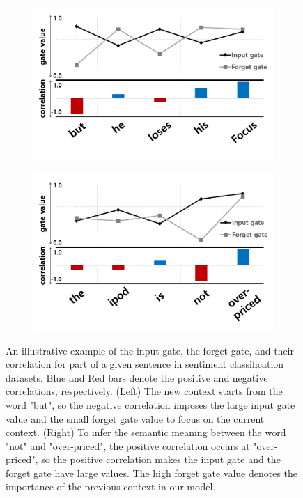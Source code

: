 \documentclass[letterpaper]{article} %
\begin{document}
\begin{figure}
	\centering
	\begin{subfigure}[]{0.48\columnwidth}
		\includegraphics[width=\linewidth]{intro_fig2.png}
	\end{subfigure}
	\begin{subfigure}[]{0.48\columnwidth}
		\includegraphics[width=\linewidth]{intro_fig1.png}
	\end{subfigure}
	\caption{An illustrative example of the input gate, the forget gate, and their correlation for part of a given sentence in sentiment classification datasets. Blue and Red bars denote the positive and negative correlations, respectively.
		(Left) The new context starts from the word "but", so the negative correlation imposes the large input gate value and the small forget gate value to focus on the current context. 
		(Right) To infer the semantic meaning between the word "not" and "over-priced", the positive correlation occurs at "over-priced", so the positive correlation makes the input gate and the forget gate have large values. The high forget gate value denotes the importance of the previous context in our model.}
	\label{fig:intro_example}
\end{figure}
\end{document}
